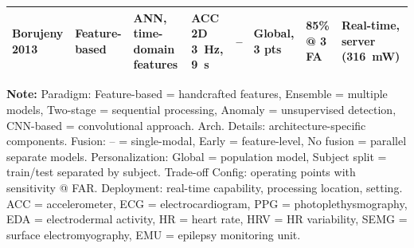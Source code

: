 \begin{landscape}
\begin{table}[htbp]
\begin{tabularx}{\linewidth}{@{} l X X X X X X X @{}}
\textbf{Borujeny 2013} & Feature-based & ANN, time-domain features & ACC 2D 3~Hz, 9~s & -- & Global, 3 pts & 85\% @ 3 FA & Real-time, server (316~mW) \\
\bottomrule
\end{tabularx}
\par\medskip
\scriptsize
\textbf{Note:} Paradigm: Feature-based = handcrafted features, Ensemble = multiple models, Two-stage = sequential processing, Anomaly = unsupervised detection, CNN-based = convolutional approach. Arch. Details: architecture-specific components. Fusion: -- = single-modal, Early = feature-level, No fusion = parallel separate models. Personalization: Global = population model, Subject split = train/test separated by subject. Trade-off Config: operating points with sensitivity @ FAR. Deployment: real-time capability, processing location, setting. ACC = accelerometer, ECG = electrocardiogram, PPG = photoplethysmography, EDA = electrodermal activity, HR = heart rate, HRV = HR variability, SEMG = surface electromyography, EMU = epilepsy monitoring unit.
\end{table}
\end{landscape}
